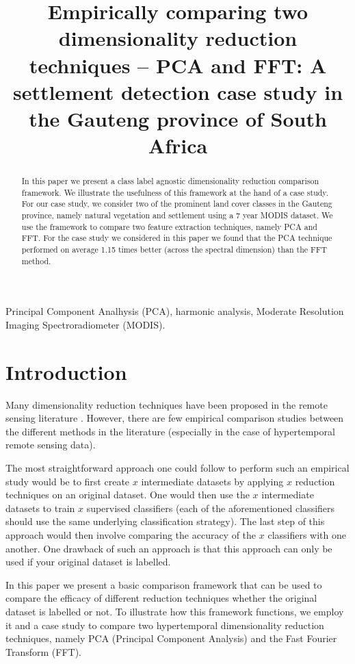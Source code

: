 \documentclass{article}
\title{Empirically comparing two dimensionality reduction techniques -- PCA and FFT: A settlement detection case study in the Gauteng province of South Africa}
\begin{document}
%
\maketitle
%
\begin{abstract}
In this paper we present a class label agnostic dimensionality reduction comparison framework. 
We illustrate the usefulness of this framework at the hand of a case study. For our case study, we consider two of the prominent land cover classes in the Gauteng province, namely natural vegetation and settlement using a 7 year MODIS dataset. We use the framework to compare two 
feature extraction techniques, namely PCA and FFT. For the case study we considered in this paper we found that the PCA technique performed on average 1.15 times better (across the spectral dimension) than the FFT method.
\end{abstract}
%
\begin{keywords}
Principal Component Analhysis (PCA), harmonic analysis, Moderate Resolution Imaging Spectroradiometer (MODIS).
\end{keywords}
%

\section{Introduction}
\label{sec:intro}

Many dimensionality reduction techniques have been proposed in the remote sensing literature \cite{grobler2012}. However, there are few empirical comparison studies between the different methods
in the literature (especially in the case of hypertemporal remote sensing data). 

The most straightforward approach one could follow to perform such an empirical 
study would be to first create $x$ intermediate datasets by applying $x$ reduction techniques on an original dataset. One would then use the $x$ intermediate 
datasets to train $x$ supervised classifiers (each of the aforementioned classifiers should use the same underlying classification strategy). The last step of this approach would then 
involve comparing the accuracy of the $x$ classifiers with one another. One drawback of such an approach is that this approach can only be used if your original dataset is 
labelled. 

In this paper we present a basic comparison framework that can be used to compare the 
efficacy of different reduction techniques whether the original dataset is labelled or not. To illustrate how this framework functions, we employ it and a case study to compare two hypertemporal 
dimensionality reduction techniques, namely PCA (Principal Component Analysis) and the Fast Fourier Transform (FFT).
\end{document}
